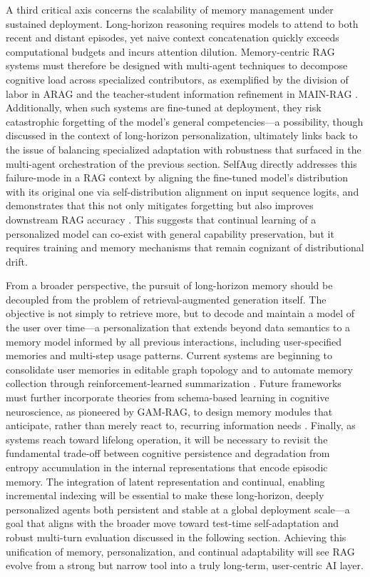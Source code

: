 \documentclass[11pt,a4paper]{article}
\begin{document}
A third critical axis concerns the scalability of memory management under sustained deployment. Long-horizon reasoning requires models to attend to both recent and distant episodes, yet naive context concatenation quickly exceeds computational budgets and incurs attention dilution. Memory-centric RAG systems must therefore be designed with multi-agent techniques to decompose cognitive load across specialized contributors, as exemplified by the division of labor in ARAG \cite{arxiv:2506.21931v2} and the teacher-student information refinement in MAIN-RAG \cite{arxiv:2501.00332v1}. Additionally, when such systems are fine-tuned at deployment, they risk catastrophic forgetting of the model's general competencies---a possibility, though discussed in the context of long-horizon personalization, ultimately links back to the issue of balancing specialized adaptation with robustness that surfaced in the multi-agent orchestration of the previous section. SelfAug directly addresses this failure-mode in a RAG context by aligning the fine-tuned model's distribution with its original one via self-distribution alignment on input sequence logits, and demonstrates that this not only mitigates forgetting but also improves downstream RAG accuracy \cite{arxiv:2509.03934v1}. This suggests that continual learning of a personalized model can co-exist with general capability preservation, but it requires training and memory mechanisms that remain cognizant of distributional drift.

From a broader perspective, the pursuit of long-horizon memory should be decoupled from the problem of retrieval-augmented generation itself. The objective is not simply to retrieve more, but to decode and maintain a model of the user over time---a personalization that extends beyond data semantics to a memory model informed by all previous interactions, including user-specified memories and multi-step usage patterns. Current systems are beginning to consolidate user memories in editable graph topology and to automate memory collection through reinforcement-learned summarization \cite{arxiv:2409.19401v1}. Future frameworks must further incorporate theories from schema-based learning in cognitive neuroscience, as pioneered by GAM-RAG, to design memory modules that anticipate, rather than merely react to, recurring information needs \cite{arxiv:2603.01783v1}. Finally, as systems reach toward lifelong operation, it will be necessary to revisit the fundamental trade-off between cognitive persistence and degradation from entropy accumulation in the internal representations that encode episodic memory. The integration of latent representation and continual, enabling incremental indexing will be essential to make these long-horizon, deeply personalized agents both persistent and stable at a global deployment scale---a goal that aligns with the broader move toward test-time self-adaptation and robust multi-turn evaluation discussed in the following section. Achieving this unification of memory, personalization, and continual adaptability will see RAG evolve from a strong but narrow tool into a truly long-term, user-centric AI layer.
\end{document}
